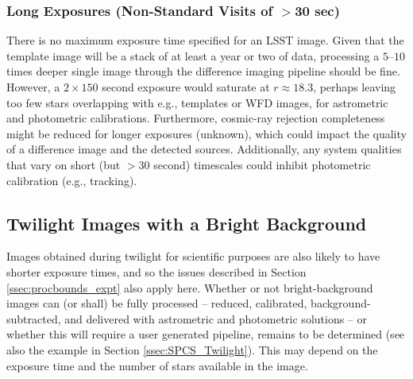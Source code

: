\documentclass[DM,lsstdoc,toc]{lsstdoc}
\begin{document}


\subsubsection{Long Exposures (Non-Standard Visits of $>$30 sec)}

There is no maximum exposure time specified for an LSST image.
Given that the template image will be a stack of at least a year or two of data, processing a $5$--$10$ times deeper single image through the difference imaging pipeline should be fine.
However, a $2\times150$ second exposure would saturate at $r \approx 18.3$, perhaps leaving too few stars overlapping with e.g., templates or WFD images, for astrometric and photometric calibrations.
Furthermore, cosmic-ray rejection completeness might be reduced for longer exposures (unknown), which could impact the quality of a difference image and the detected sources.
Additionally, any system qualities that vary on short (but $>30$ second) timescales could inhibit photometric calibration (e.g., tracking).


\subsection{Twilight Images with a Bright Background}

Images obtained during twilight for scientific purposes are also likely to have shorter exposure times, and so the issues described in Section \ref{ssec:procbounds_expt} also apply here.
Whether or not bright-background images can (or shall) be fully processed -- reduced, calibrated, background-subtracted, and delivered with astrometric and photometric solutions -- or whether this will require a user generated pipeline, remains to be determined (see also the example in Section \ref{ssec:SPCS_Twilight}).
This may depend on the exposure time and the number of stars available in the image.
\end{document}
